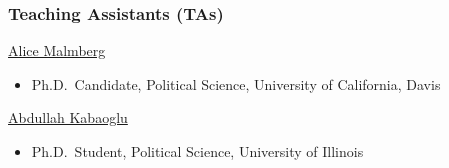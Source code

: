 \documentclass[table, xcolor = {dvipsnames}, 9pt]{beamer}
\theoremstyle{plain}
\begin{document}
\begin{frame}[t]
\frametitle{Teaching Assistants (TAs)}
\vfill
\href{https://www.alicemalmberg.com/}{Alice Malmberg} \vfill
\begin{itemize} \vfill
\item Ph.D.~Candidate, Political Science, University of California, Davis \vfill
\end{itemize} \vfill
\href{https://pol.illinois.edu/directory/profile/ak72}{Abdullah Kabaoglu} \vfill
\begin{itemize} \vfill
\item Ph.D.~Student, Political Science, University of Illinois
\end{itemize} \vfill
\vfill
\end{frame}
\end{document}
